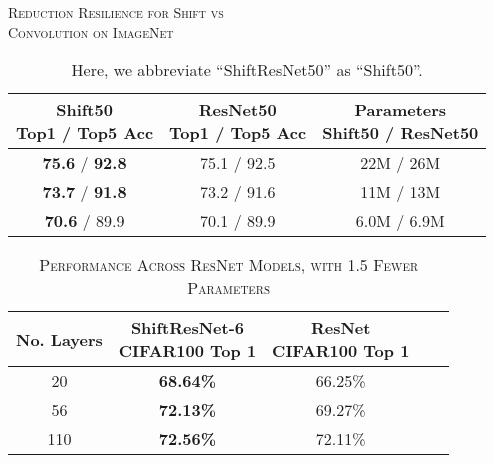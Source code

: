 \documentclass[10pt,twocolumn,letterpaper]{article}
\begin{document}
\begin{table}
\begin{center}
\caption{\textsc{Reduction Resilience for Shift vs \\Convolution on ImageNet}}
\label{tab:robust-imagenet}
\vspace{-0.1in}
\begin{tabular}{c c c}
\thead{ {\normalsize Shift50} \\ Top1 / Top5 Acc} & \thead{{\normalsize ResNet50} \\ Top1 / Top5 Acc} & \thead{{\normalsize Parameters} \\ Shift50 / ResNet50} \\
\hline
\textbf{75.6} / \textbf{92.8} & 75.1 / 92.5 & 22M / 26M\\
\textbf{73.7} / \textbf{91.8} & 73.2 / 91.6 & 11M / 13M \\
\textbf{70.6} / 89.9 & 70.1 / 89.9 & 6.0M / 6.9M \\
\hline
\end{tabular}
\caption*{Here, we abbreviate ``ShiftResNet50'' as ``Shift50''.}
\end{center}
\vspace{-0.2in}
\end{table}

\begin{table}
\begin{center}
\caption{\textsc{Performance Across ResNet 
Models, with 1.5 Fewer Parameters}}
\label{tab:shrink-model-size}
\vspace{-0.1in}
\begin{tabular}{c | c c c c}
No. Layers & \thead{ {\normalsize ShiftResNet-6} \\ CIFAR100 Top 1} & \thead{{\normalsize ResNet } \\ CIFAR100 Top 1} \\
\hline
20 & \textbf{68.64\%} & 66.25\%\\
56 & \textbf{72.13\%} & 69.27\%\\
110 & \textbf{72.56\%} & 72.11\%\\
\end{tabular}
\end{center}
\vspace{-0.2in}
\end{table}
\end{document}
